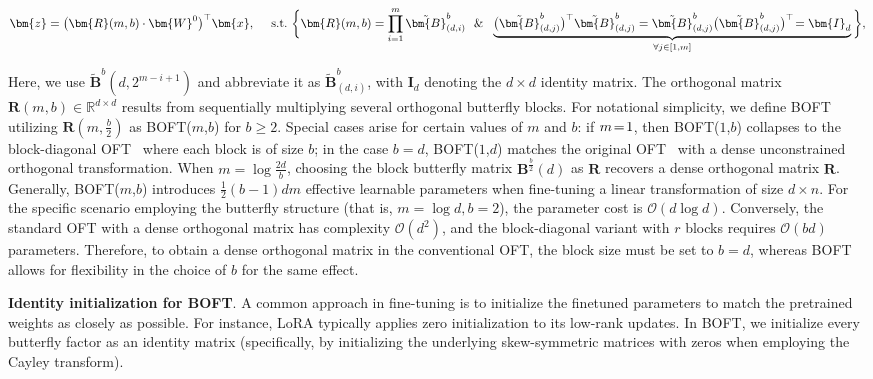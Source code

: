 \begin{equation}
    \begin{aligned}\nonumber
    \bm{z}=\big(\bm{R}(m,b)\cdot\bm{W}^0\big)^\top\bm{x},~~~~\text{s.t.}~\bigg{\{}\bm{R}(m,b)=\prod_{i=1}^m \tilde{\bm{B}}^b_{(d,i)}~~\&~~\underbrace{\big(\tilde{\bm{B}}^b_{(d,j)}\big)^\top\tilde{\bm{B}}^b_{(d,j)}=\tilde{\bm{B}}^b_{(d,j)}\big(\tilde{\bm{B}}^b_{(d,j)}\big)^\top\!=\bm{I}_d}_{\forall j\in [1, m]}\bigg{\}},
    \end{aligned}
\end{equation}

Here, we use $\tilde{\bm{B}}^b(d,2^{m - i+1})$ and abbreviate it as $\tilde{\bm{B}}^b_{(d,i)}$, with $\bm{I}_d$ denoting the $d \times d$ identity matrix. The orthogonal matrix $\bm{R}(m,b)\in\mathbb{R}^{d\times d}$ results from sequentially multiplying several orthogonal butterfly blocks. For notational simplicity, we define BOFT utilizing $\bm{R}(m,\frac{b}{2})$ as BOFT($m$,$b$) for $b\geq2$. Special cases arise for certain values of $m$ and $b$: if $\thickmuskip=2mu \medmuskip=2mu m=1$, then BOFT($1$,$b$) collapses to the block-diagonal OFT~\cite{qiu2023controlling} where each block is of size $b$; in the case $b=d$, BOFT($1$,$d$) matches the original OFT~\cite{qiu2023controlling} with a dense unconstrained orthogonal transformation. When $m = \log \frac{2d}{b}$, choosing the block butterfly matrix $\bm{B}^{\frac{b}{2}}(d)$ as $\bm{R}$ recovers a dense orthogonal matrix $\bm{R}$. Generally, BOFT($m$,$b$) introduces $\frac{1}{2}(b-1)dm$ effective learnable parameters when fine-tuning a linear transformation of size $d\times n$. For the specific scenario employing the butterfly structure (that is, $m=\log d, b=2$), the parameter cost is $\mathcal{O}(d\log d)$. Conversely, the standard OFT with a dense orthogonal matrix has complexity $\mathcal{O}(d^2)$, and the block-diagonal variant with $r$ blocks requires $\mathcal{O}(bd)$ parameters. Therefore, to obtain a dense orthogonal matrix in the conventional OFT, the block size must be set to $b=d$, whereas BOFT allows for flexibility in the choice of $b$ for the same effect.

\textbf{Identity initialization for BOFT}. A common approach in fine-tuning is to initialize the finetuned parameters to match the pretrained weights as closely as possible. For instance, LoRA typically applies zero initialization to its low-rank updates. In BOFT, we initialize every butterfly factor as an identity matrix (specifically, by initializing the underlying skew-symmetric matrices with zeros when employing the Cayley transform).

